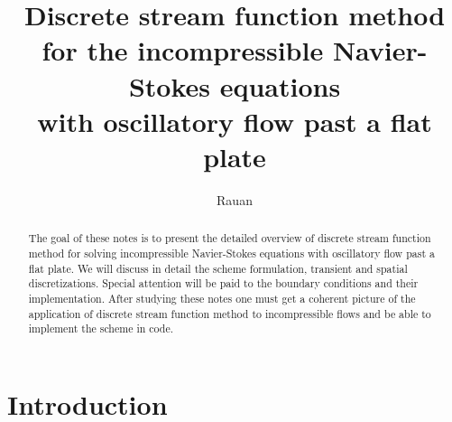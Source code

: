 \documentclass{article}
\title{Discrete stream function method \\ for the incompressible Navier-Stokes equations \\with oscillatory flow past a flat plate}
\author{Rauan}
\numberwithin{equation}{section}
\begin{document}
\maketitle

\begin{abstract}
The goal of these notes is to present the detailed overview of discrete stream function method for solving incompressible Navier-Stokes equations with oscillatory flow past a flat plate. We will discuss in detail the scheme formulation, transient and spatial discretizations. Special attention will be paid to the boundary conditions and their implementation. After studying these notes one must get a coherent picture of the application of discrete stream function method to incompressible flows and be able to implement the scheme in code.
\end{abstract}

\tableofcontents

\section{Introduction}\label{sec:introduction}
\end{document}
